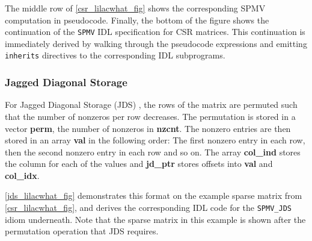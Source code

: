     The middle row of \autoref{csr_lilacwhat_fig} shows the corresponding
    SPMV computation in pseudocode.
    Finally, the bottom of the figure shows the continuation of the {\tt SPMV}
    IDL specification for CSR matrices.
    This continuation is immediately derived by walking through the pseudocode
    expressions and emitting {\tt inherits} directives to the corresponding
    IDL subprograms.

\subsubsection{Jagged Diagonal Storage}

    For Jagged Diagonal Storage (JDS) \cite{doi:10.1137/0910073}, the rows of
    the matrix are permuted such that the number of nonzeros per row  decreases.
    The permutation is stored in a vector \textbf{perm}, the number of nonzeros
    in \textbf{nzcnt}.
    The nonzero entries are then stored in an array \textbf{val} in the
    following order:
    The first nonzero entry in each row, then the second nonzero entry in
    each row and so on.
    The array \textbf{col\_ind} stores the column for each of the values and
    \textbf{jd\_ptr} stores offsets into \textbf{val} and \textbf{col\_idx}.

    \autoref{jds_lilacwhat_fig} demonstrates this format on the example sparse
    matrix from \autoref{csr_lilacwhat_fig}, and derives the corresponding IDL
    code for the {\tt SPMV\_JDS} idiom underneath.
    Note that the sparse matrix in this example is shown after the permutation
    operation that JDS requires.

